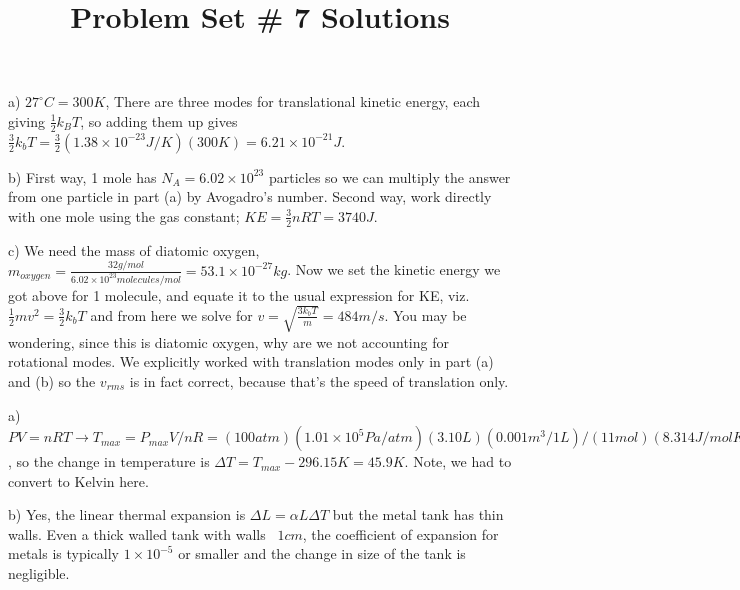 \documentclass[10pt]{article}
\newenvironment{problem}[2][Problem]{\begin{trivlist}
\item[\hskip \labelsep {\bfseries #1}\hskip \labelsep {\bfseries #2.}]}{\end{trivlist}}
\begin{document}
 \title{Problem Set \# 7 Solutions}
\date{}
\author{}
\maketitle

\begin{problem}{1} 
\item a) $27^\circ C=300K$, There are three modes for translational kinetic energy, each giving $\frac{1}{2}k_BT$, so adding them up gives $\frac{3}{2}k_bT=\frac{3}{2}(1.38\times 10^{-23}J/K)(300K)=6.21\times 10^{-21}J$.
\item b) First way, 1 mole has $N_A=6.02\times 10^{23}$ particles so we can multiply the answer from one particle in part (a) by Avogadro's number. Second way, work directly with one mole using the gas constant; $KE=\frac{3}{2}nRT=3740J$.
\item c) We need the mass of diatomic oxygen, $m_{oxygen}=\frac{32 g/mol}{6.02\times 10^23 molecules/mol} = 53.1\times 10^{-27}kg$. Now we set the kinetic energy we got above for 1 molecule, and equate it to the usual expression for KE, viz. $\frac{1}{2}mv^2=\frac{3}{2}k_bT$ and from here we solve for $v=\sqrt{\frac{3k_bT}{m}}=484m/s$. You may be wondering, since this is diatomic oxygen, why are we not accounting for rotational modes. We explicitly worked with translation modes only in part (a) and (b) so the $v_{rms}$ is in fact correct, because that's the speed of translation only.
\end{problem}

\begin{problem}{2} 
\item a) $PV=nRT \xrightarrow{} T_{max}= P_{max}V/nR= (100atm)(1.01\times 10^5 Pa/atm)(3.10L)(0.001m^3/1L)/(11mol)(8.314J/molK)=342K$, so the change in temperature is $\Delta T = T_{max} - 296.15K=45.9K$. Note, we had to convert to Kelvin here.
\item b) Yes, the linear thermal expansion is $\Delta L = \alpha L \Delta T$ but the metal tank has thin walls.  Even a thick walled tank with walls ~$1cm$, the coefficient of expansion for metals is typically $1\times 10^{-5}$ or smaller and the change in size of the tank is negligible.
\end{problem}
\end{document}
